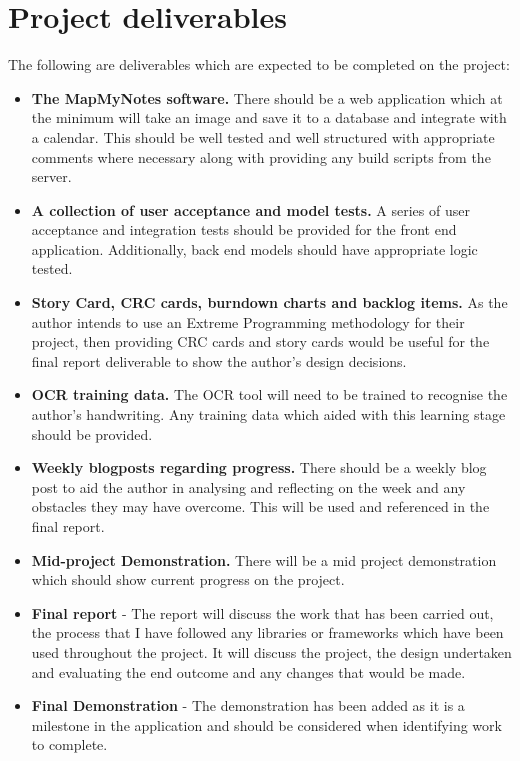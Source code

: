 \documentclass[11pt,fleqn,twoside]{article}
\begin{document}
\section{Project deliverables}
The following are deliverables which are expected to be completed on the project:
\begin{itemize}

  \item \textbf{The MapMyNotes software.} There should be a web application which at the minimum will take an image and save it to a database and integrate with a calendar. This should be well tested and well structured with appropriate comments where necessary along with providing any build scripts from the server.

  \item \textbf{A collection of user acceptance and model tests.} A series of user acceptance and integration tests should be provided for the front end application. Additionally, back end models should have appropriate logic tested.

  \item \textbf{Story Card, CRC cards, burndown charts and backlog items.} As the author intends to use an Extreme Programming methodology for their project, then providing CRC cards and story cards would be useful for the final report deliverable to show the author's design decisions.

  \item \textbf{OCR training data.} The OCR tool will need to be trained to recognise the author's handwriting. Any training data which aided with this learning stage should be provided.

  \item \textbf{Weekly blogposts regarding progress.} There should be a weekly blog post to aid the author in analysing and reflecting on the week and any obstacles they may have overcome. This will be used and referenced in the final report.

  \item \textbf{Mid-project Demonstration.} There will be a mid project demonstration which should show current progress on the project.

  \item \textbf{Final report} - The report will discuss the work that has been carried out, the process that I have followed any libraries or frameworks which have been used throughout the project. It will discuss the project, the design undertaken and evaluating the end outcome and any changes that would be made.

  \item \textbf{Final Demonstration} - The demonstration has been added as it is a milestone in the application and should be considered when identifying work to complete.

\end{itemize}
\end{document}
